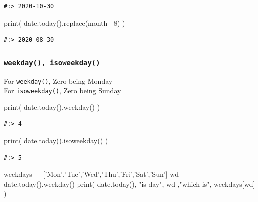 \documentclass[
]{book}
\newenvironment{Shaded}{\begin{snugshade}}{\end{snugshade}}
\newcommand{\BuiltInTok}[1]{#1}
\newcommand{\DecValTok}[1]{\textcolor[rgb]{0.06,0.06,0.06}{#1}}
\newcommand{\NormalTok}[1]{#1}
\newcommand{\OperatorTok}[1]{\textcolor[rgb]{0.43,0.43,0.43}{\textbf{#1}}}
\newcommand{\StringTok}[1]{\textcolor[rgb]{0.5,0.5,0.5}{#1}}
\begin{document}
\begin{verbatim}
#:> 2020-10-30
\end{verbatim}

\begin{Shaded}
\begin{Highlighting}[]
\BuiltInTok{print}\NormalTok{( date.today().replace(month}\OperatorTok{=}\DecValTok{8}\NormalTok{) )}
\end{Highlighting}
\end{Shaded}

\begin{verbatim}
#:> 2020-08-30
\end{verbatim}

\hypertarget{weekday-isoweekday}{%
\subsubsection{\texorpdfstring{\texttt{weekday(),\ isoweekday()}}{weekday(), isoweekday()}}\label{weekday-isoweekday}}

For \texttt{weekday()}, Zero being Monday\\
For \texttt{isoweekday()}, Zero being Sunday

\begin{Shaded}
\begin{Highlighting}[]
\BuiltInTok{print}\NormalTok{( date.today().weekday() )}
\end{Highlighting}
\end{Shaded}

\begin{verbatim}
#:> 4
\end{verbatim}

\begin{Shaded}
\begin{Highlighting}[]
\BuiltInTok{print}\NormalTok{( date.today().isoweekday() )}
\end{Highlighting}
\end{Shaded}

\begin{verbatim}
#:> 5
\end{verbatim}

\begin{Shaded}
\begin{Highlighting}[]
\NormalTok{weekdays }\OperatorTok{=}\NormalTok{ [}\StringTok{'Mon'}\NormalTok{,}\StringTok{'Tue'}\NormalTok{,}\StringTok{'Wed'}\NormalTok{,}\StringTok{'Thu'}\NormalTok{,}\StringTok{'Fri'}\NormalTok{,}\StringTok{'Sat'}\NormalTok{,}\StringTok{'Sun'}\NormalTok{]}
\NormalTok{wd }\OperatorTok{=}\NormalTok{ date.today().weekday()}
\BuiltInTok{print}\NormalTok{( date.today(), }\StringTok{"is day"}\NormalTok{, wd ,}\StringTok{"which is"}\NormalTok{, weekdays[wd] )}
\end{Highlighting}
\end{Shaded}
\end{document}
